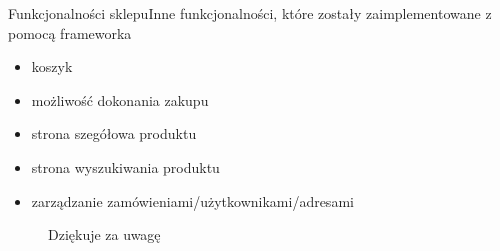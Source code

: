 \documentclass[polish,xcolor=table,9pt,aspectratio=1610,hyperref={pdfpagemode=FullScreen}]{beamer}
\begin{document}
\begin{frame}{Funkcjonalności sklepu}{Inne funkcjonalności, które zostały zaimplementowane z pomocą frameworka}
\begin{itemize}
	\item<1-> koszyk
	\item<1-> możliwość dokonania zakupu
	\item<1-> strona szegółowa produktu
	\item<1-> strona wyszukiwania produktu
	\item<1-> zarządzanie zamówieniami/użytkownikami/adresami 
\end{itemize}
\end{frame}

\begin{frame}
\begin{figure}
	Dziękuje za uwagę
\end{figure}
\end{frame}
\end{document}
